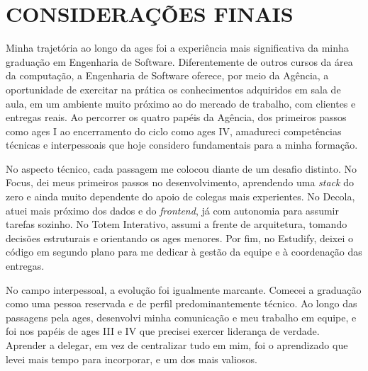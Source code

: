 \chapter[Considerações Finais]{CONSIDERAÇÕES FINAIS}

Minha trajetória ao longo da \ac{ages} foi a experiência mais significativa da minha graduação em Engenharia de Software. Diferentemente de outros cursos da área da computação, a Engenharia de Software oferece, por meio da Agência, a oportunidade de exercitar na prática os conhecimentos adquiridos em sala de aula, em um ambiente muito próximo ao do mercado de trabalho, com clientes e entregas reais. Ao percorrer os quatro papéis da Agência, dos primeiros passos como \ac{ages} I ao encerramento do ciclo como \ac{ages} IV, amadureci competências técnicas e interpessoais que hoje considero fundamentais para a minha formação.

No aspecto técnico, cada passagem me colocou diante de um desafio distinto. No Focus, dei meus primeiros passos no desenvolvimento, aprendendo uma \textit{stack} do zero e ainda muito dependente do apoio de colegas mais experientes. No Decola, atuei mais próximo dos dados e do \textit{frontend}, já com autonomia para assumir tarefas sozinho. No Totem Interativo, assumi a frente de arquitetura, tomando decisões estruturais e orientando os \ac{ages} menores. Por fim, no Estudify, deixei o código em segundo plano para me dedicar à gestão da equipe e à coordenação das entregas.

No campo interpessoal, a evolução foi igualmente marcante. Comecei a graduação como uma pessoa reservada e de perfil predominantemente técnico. Ao longo das passagens pela \ac{ages}, desenvolvi minha comunicação e meu trabalho em equipe, e foi nos papéis de \ac{ages} III e IV que precisei exercer liderança de verdade. Aprender a delegar, em vez de centralizar tudo em mim, foi o aprendizado que levei mais tempo para incorporar, e um dos mais valiosos.

